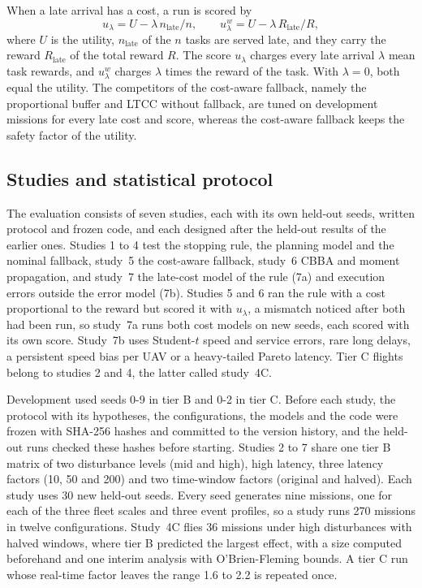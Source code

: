 \documentclass[a4paper,fleqn]{cas-dc}
\newcommand{\mname}{LTCC}  %
\newcounter{prop}
\begin{document}
When a late arrival has a cost, a run is scored by
\begin{equation}\label{eq:score}
u_\lambda=U-\lambda\,n_{\mathrm{late}}/n,\qquad u^w_\lambda=U-\lambda\,R_{\mathrm{late}}/R,
\end{equation}
where $U$ is the utility, $n_{\mathrm{late}}$ of the $n$ tasks are served late, and they carry the reward
$R_{\mathrm{late}}$ of the total reward $R$. The score $u_\lambda$ charges every late arrival $\lambda$ mean task
rewards, and $u^w_\lambda$ charges $\lambda$ times the reward of the task. With $\lambda=0$, both equal the utility. The
competitors of the cost-aware fallback, namely the proportional buffer and \mname{} without fallback, are tuned on
development missions for every late cost and score, whereas the cost-aware fallback keeps the safety factor of the
utility.

\subsection{Studies and statistical protocol}\label{sec:protocol}
The evaluation consists of seven studies, each with its own held-out seeds, written protocol and frozen code, and each
designed after the held-out results of the earlier ones. Studies 1 to 4 test the stopping rule, the planning model and
the nominal fallback, study~5 the cost-aware fallback, study~6 CBBA and moment propagation, and study~7 the late-cost
model of the rule (7a) and execution errors outside the error model (7b). Studies 5 and 6 ran the rule with a cost
proportional to the reward but scored it with $u_\lambda$, a mismatch noticed after both had been run, so study~7a runs
both cost models on new seeds, each scored with its own score. Study~7b uses Student-$t$ speed and service errors, rare
long delays, a persistent speed bias per UAV or a heavy-tailed Pareto latency. Tier C flights belong to studies 2 and
4, the latter called study~4C.

Development used seeds 0-9 in tier B and 0-2 in tier C. Before each study, the protocol with its hypotheses, the
configurations, the models and the code were frozen with SHA-256 hashes and committed to the version history, and the
held-out runs checked these hashes before starting. Studies 2 to 7 share one tier B matrix of two disturbance levels
(mid and high), high latency, three latency factors (10, 50 and 200) and two time-window factors (original and halved).
Each study uses 30 new held-out seeds. Every seed generates nine missions, one for each of the three fleet scales and
three event profiles, so a study runs 270 missions in twelve configurations. Study~4C flies 36 missions under high
disturbances with halved windows, where tier B predicted the largest effect, with a size computed beforehand and one
interim analysis with O'Brien-Fleming bounds. A tier C run whose real-time factor leaves the range 1.6 to 2.2 is
repeated once.
\end{document}
